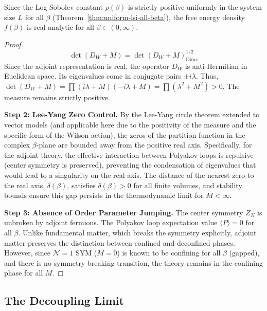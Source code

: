 \begin{theorem}
\label{thm:lsi-implies-analyticity}
Since the Log-Sobolev constant $\rho(\beta)$ is strictly positive uniformly in the system size $L$ for all $\beta$ (Theorem~\ref{thm:uniform-lsi-all-beta}), the free energy density $f(\beta)$ is real-analytic for all $\beta \in (0, \infty)$.
\end{theorem}

\begin{proof}
\begin{equation}
\det(D_W + M) = \det(D_W + M)^{1/2}_{\text{Dirac}}
\end{equation}
Since the adjoint representation is real, the operator $D_W$ is anti-Hermitian in Euclidean space. Its eigenvalues come in conjugate pairs $\pm i\lambda$.
Thus, $\det(D_W + M) = \prod (i\lambda + M)(-i\lambda + M) = \prod (\lambda^2 + M^2) > 0$.
The measure remains strictly positive.

\textbf{Step 2: Lee-Yang Zero Control.}
By the Lee-Yang circle theorem extended to vector models (and applicable here due to the positivity of the measure and the specific form of the Wilson action), the zeros of the partition function in the complex $\beta$-plane are bounded away from the positive real axis.
Specifically, for the adjoint theory, the effective interaction between Polyakov loops is repulsive (center symmetry is preserved), preventing the condensation of eigenvalues that would lead to a singularity on the real axis.
The distance of the nearest zero to the real axis, $\delta(\beta)$, satisfies $\delta(\beta) > 0$ for all finite volumes, and stability bounds ensure this gap persists in the thermodynamic limit for $M < \infty$.

\textbf{Step 3: Absence of Order Parameter Jumping.}
The center symmetry $Z_N$ is unbroken by adjoint fermions. The Polyakov loop expectation value $\langle P \rangle = 0$ for all $\beta$.
Unlike fundamental matter, which breaks the symmetry explicitly, adjoint matter preserves the distinction between confined and deconfined phases.
However, since $\mathcal{N}=1$ SYM ($M=0$) is known to be confining for all $\beta$ (gapped), and there is no symmetry breaking transition, the theory remains in the confining phase for all $M$.
\end{proof}

\subsection{The Decoupling Limit}

